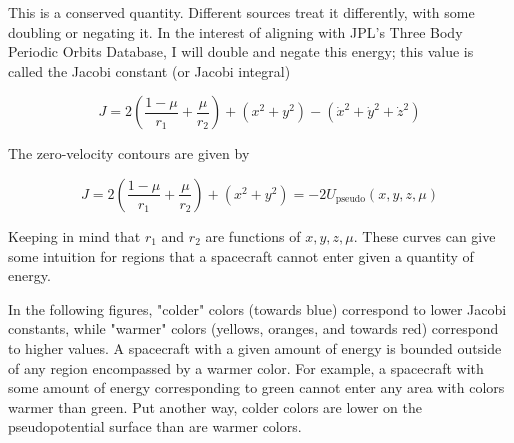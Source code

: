 \documentclass{article}
\begin{document}
This is a conserved quantity. Different sources treat it differently, with some doubling or negating it. In the interest of aligning with JPL's Three Body Periodic Orbits Database, I will double and negate this energy; this value is called the Jacobi constant (or Jacobi integral)

\[\boxed{J=2\left(\frac{1-\mu}{r_1}+\frac{\mu}{r_2}\right)+\left(x^2+y^2\right)-\left(\dot{x}^2+\dot{y}^2+\dot{z}^2\right)}\]

The zero-velocity contours are given by

\[J=2\left(\frac{1-\mu}{r_1}+\frac{\mu}{r_2}\right)+\left(x^2+y^2\right)=-2U_\text{pseudo}(x,y,z,\mu)\]

Keeping in mind that $r_1$ and $r_2$ are functions of $x, y, z, \mu$. These curves can give some intuition for regions that a spacecraft cannot enter given a quantity of energy.

In the following figures, "colder" colors (towards blue) correspond to lower Jacobi constants, while "warmer" colors (yellows, oranges, and towards red) correspond to higher values. A spacecraft with a given amount of energy is bounded outside of any region encompassed by a warmer color. For example, a spacecraft with some amount of energy corresponding to green cannot enter any area with colors warmer than green. Put another way, colder colors are lower on the pseudopotential surface than are warmer colors. 
\end{document}
